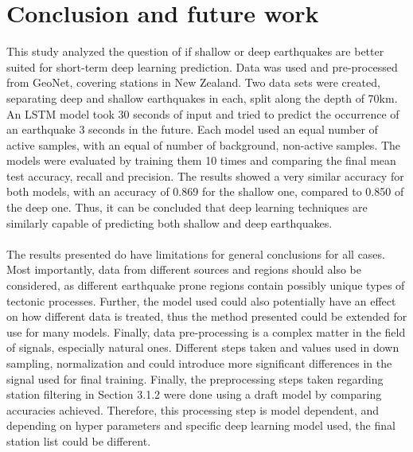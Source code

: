 \section{Conclusion and future work}
This study analyzed the question of if shallow or deep earthquakes are better suited for short-term deep learning prediction. Data was used and pre-processed from GeoNet, covering stations in New Zealand. Two data sets were created, separating deep and shallow earthquakes in each, split along the depth of 70km. An LSTM model took 30 seconds of input and tried to predict the occurrence of an earthquake 3 seconds in the future. Each model used an equal number of active samples, with an equal of number of background, non-active samples. The models were evaluated by training them 10 times and comparing the final mean test accuracy, recall and precision. The results showed a very similar accuracy for both models, with an accuracy of  0.869 for the shallow one, compared to 0.850 of the deep one. Thus, it can be concluded that deep learning techniques are similarly capable of predicting both shallow and deep earthquakes. \\
\\
The results presented do have limitations for general conclusions for all cases. Most importantly, data from different sources and regions should also be considered, as different earthquake prone regions contain possibly unique types of tectonic processes. Further, the model used could also potentially have an effect on how different data is treated, thus the method presented could be extended for use for many models. Finally, data pre-processing is a complex matter in the field of signals, especially natural ones. Different steps taken and values used in down sampling, normalization and could introduce more significant differences in the signal used for final training. Finally, the preprocessing steps taken regarding station filtering in Section 3.1.2 were done using a draft model by comparing accuracies achieved. Therefore, this processing step is model dependent, and depending on hyper parameters and specific deep learning model used, the final station list could be different. 